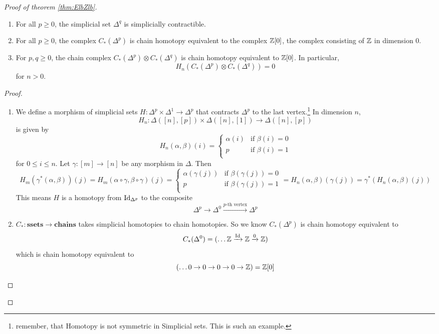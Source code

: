 \documentclass[language=english]{TemplateLecture}
\begin{document}
\begin{proof}[Proof of theorem \ref{thm:ElbZlb}]
    \begin{proposition}\leavevmode
        \begin{enumerate}
            \item For all \(p\geq 0\), the simplicial set \(\Delta^q\) is simplicially contractible.
            \item For all \(p \geq 0\), the complex \(C_*(\Delta^p)\) is chain homotopy equivalent to the complex \(\mathbb{Z}[0]\), the complex consisting of \(\mathbb{Z}\) in dimension \(0\).
            \item For \(p,q \geq 0\), the chain complex \(C_*(\Delta^p) \otimes C_*(\Delta^q)\) is chain homotopy equivalent to \(\mathbb{Z}[0]\). In particular,
            \[H_n(C_*(\Delta^p) \otimes C_*(\Delta^q)) = 0\]
            for \(n > 0\).
        \end{enumerate}
    \end{proposition}
    \begin{proof}\leavevmode
        \begin{enumerate}
            \item We define a morphism of simplicial sets \(H\colon \Delta^p \times \Delta^1 \to \Delta^p\) that contracts \(\Delta^p\) to the last vertex.\footnote{remember, that Homotopy is not symmetric in Simplicial sets. This is such an example.}
            In dimension \(n\),
            \[H_n\colon \Delta([n], [p]) \times \Delta([n],[1]) \to \Delta([n], [p])\]
            is given by
            \[H_n(\alpha, \beta)(i) = \begin{cases}
                \alpha(i) & \text{if } \beta(i) = 0 \\
                p & \text{if } \beta(i) = 1 \\
            \end{cases}\]
            for \(0 \leq i \leq n\). Let \(\gamma\colon [m] \to [n]\) be any morphism in \(\Delta\). Then
            \[H_m(\gamma^*(\alpha,\beta))(j) = H_m(\alpha\circ \gamma, \beta\circ \gamma)(j) = \begin{cases}
                \alpha(\gamma(j)) & \text{if } \beta(\gamma(j)) = 0 \\
                p & \text{if } \beta(\gamma(j)) = 1 \\
            \end{cases} = H_n(\alpha,\beta)(\gamma(j)) = \gamma^*(H_n(\alpha,\beta)(j))\]
            This means \(H\) is a homotopy from \(\operatorname{Id}_{\Delta^p}\) to the composite
            \[\Delta^p \to \Delta^0 \xrightarrow{p\text{-th vertex}} \Delta^p\]
            \item \(C_*\colon \mathbf{ssets} \to \mathbf{chains}\) takes simplicial homotopies to chain homotopies. So we know \(C_*(\Delta^p)\) is chain homotopy equivalent to
            \[C_*(\Delta^0) = (\dots \mathbb{Z} \xrightarrow{\operatorname{Id}} \mathbb{Z} \xrightarrow{0} \mathbb{Z})\]
            which is chain homotopy equivalent to
            \[(\dots 0 \to 0 \to 0 \to 0 \to \mathbb{Z}) = \mathbb{Z}[0]\]


\end{enumerate}
\end{proof}
\end{proof}
\end{document}

